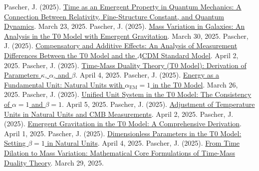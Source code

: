 \documentclass[12pt,a4paper]{article}
\newcommand{\alphaEM}{\alpha_{\text{EM}}}
\begin{document}
	\begin{thebibliography}{99}
		 Pascher, J. (2025). \href{https://github.com/jpascher/T0-Time-Mass-Duality/tree/main/2/pdf/English/ZeitEmergentQMEn.pdf}{Time as an Emergent Property in Quantum Mechanics: A Connection Between Relativity, Fine-Structure Constant, and Quantum Dynamics}. March 23, 2025.
		 Pascher, J. (2025). \href{https://github.com/jpascher/T0-Time-Mass-Duality/tree/main/2/pdf/English/MassVarGalaxienEn.pdf}{Mass Variation in Galaxies: An Analysis in the T0 Model with Emergent Gravitation}. March 30, 2025.
		 Pascher, J. (2025). \href{https://github.com/jpascher/T0-Time-Mass-Duality/tree/main/2/pdf/English/MessdifferenzenT0StandardEn.pdf}{Compensatory and Additive Effects: An Analysis of Measurement Differences Between the T0 Model and the \(\Lambda\)CDM Standard Model}. April 2, 2025.
		 Pascher, J. (2025). \href{https://github.com/jpascher/T0-Time-Mass-Duality/tree/main/2/pdf/English/ZeitMasseT0ParamsEn.pdf}{Time-Mass Duality Theory (T0 Model): Derivation of Parameters \(\kappa\), \(\alpha\), and \(\beta\)}. April 4, 2025.
		 Pascher, J. (2025). \href{https://github.com/jpascher/T0-Time-Mass-Duality/tree/main/2/pdf/English/NatEinheitenAlpha1En.pdf}{Energy as a Fundamental Unit: Natural Units with \(\alphaEM = 1\) in the T0 Model}. March 26, 2025.
		 Pascher, J. (2025). \href{https://github.com/jpascher/T0-Time-Mass-Duality/tree/main/2/pdf/English/Alpha1Beta1KonsistenzEn.pdf}{Unified Unit System in the T0 Model: The Consistency of \(\alpha = 1\) and \(\beta = 1\)}. April 5, 2025.
		 Pascher, J. (2025). \href{https://github.com/jpascher/T0-Time-Mass-Duality/tree/main/2/pdf/English/TempEinheitenCMBEn.pdf}{Adjustment of Temperature Units in Natural Units and CMB Measurements}. April 2, 2025.
		 Pascher, J. (2025). \href{https://github.com/jpascher/T0-Time-Mass-Duality/tree/main/2/pdf/English/EmergentGravT0En.pdf}{Emergent Gravitation in the T0 Model: A Comprehensive Derivation}. April 1, 2025.
		 Pascher, J. (2025). \href{https://github.com/jpascher/T0-Time-Mass-Duality/tree/main/2/pdf/English/Alpha1Beta1KonsistenzEn.pdf}{Dimensionless Parameters in the T0 Model: Setting \(\beta = 1\) in Natural Units}. April 4, 2025.
		 Pascher, J. (2025). \href{https://github.com/jpascher/T0-Time-Mass-Duality/tree/main/2/pdf/English/MathZeitMasseLagrange.pdf}{From Time Dilation to Mass Variation: Mathematical Core Formulations of Time-Mass Duality Theory}. March 29, 2025.

\end{thebibliography}
\end{document}

